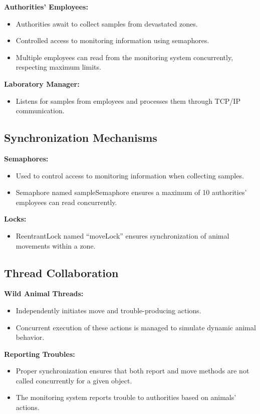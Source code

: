 \documentclass{article}
\begin{document}
\textbf{Authorities' Employees:}
\begin{itemize}
    \item Authorities await to collect samples from devastated zones.
    \item Controlled access to monitoring information using semaphores.
    \item Multiple employees can read from the monitoring system concurrently, respecting maximum limits.
\end{itemize}

\textbf{Laboratory Manager:}
\begin{itemize}
    \item Listens for samples from employees and processes them through TCP/IP communication.
\end{itemize}

\subsection{Synchronization Mechanisms}
\textbf{Semaphores:}
\begin{itemize}
    \item Used to control access to monitoring information when collecting samples.
    \item Semaphore named sampleSemaphore ensures a maximum of 10 authorities' employees can read concurrently.
\end{itemize}

\textbf{Locks:}
\begin{itemize}
    \item ReentrantLock named ``moveLock'' ensures synchronization of animal movements within a zone.
\end{itemize}

\subsection{Thread Collaboration}
\textbf{Wild Animal Threads:}
\begin{itemize}
    \item Independently initiates move and trouble-producing actions.
    \item Concurrent execution of these actions is managed to simulate dynamic animal behavior.
\end{itemize}

\textbf{Reporting Troubles:}
\begin{itemize}
    \item Proper synchronization ensures that both report and move methods are not called concurrently for a given object.
    \item The monitoring system reports trouble to authorities based on animals' actions.
\end{itemize}
\end{document}
